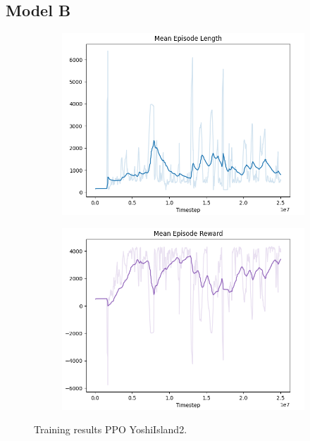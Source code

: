 \documentclass[a4paper]{article}
\begin{document}
\subsection{Model B}
\begin{figure}[htbp]
    \centering
    \begin{subfigure}{.5\textwidth}
        \centering
        \includegraphics[width=\textwidth]{PPO_YoshiIsland2_len}
        \label{fig:result2:sub1}
    \end{subfigure}%
    \begin{subfigure}{.5\textwidth}
        \centering
        \includegraphics[width=\textwidth]{PPO_YoshiIsland2_rew}
        \label{fig:result2:sub2}
    \end{subfigure}
    \caption{Training results PPO YoshiIsland2.}
    \label{fig:result2}
\end{figure}

\printbibliography
\end{document}
